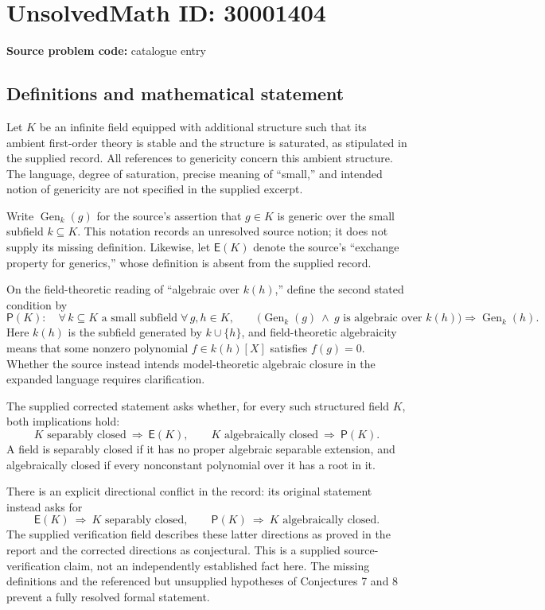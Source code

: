 \documentclass[11pt]{article}
\begin{document}
\section*{UnsolvedMath ID: 30001404}
\textbf{Source problem code:} catalogue entry
\subsection{Definitions and mathematical statement}
Let \(K\) be an infinite field equipped with additional structure such that its ambient first-order theory is stable and the structure is saturated, as stipulated in the supplied record. All references to genericity concern this ambient structure. The language, degree of saturation, precise meaning of ``small,'' and intended notion of genericity are not specified in the supplied excerpt.

Write \(\operatorname{Gen}_k(g)\) for the source's assertion that \(g\in K\) is generic over the small subfield \(k\subseteq K\). This notation records an unresolved source notion; it does not supply its missing definition. Likewise, let \(\mathsf{E}(K)\) denote the source's ``exchange property for generics,'' whose definition is absent from the supplied record.

On the field-theoretic reading of ``algebraic over \(k(h)\),'' define the second stated condition by
\[
\mathsf{P}(K):\quad
\forall\, k\subseteq K\text{ a small subfield}\;
\forall\,g,h\in K,\qquad
\bigl(\operatorname{Gen}_k(g)\ \land\ g\text{ is algebraic over }k(h)\bigr)
\Longrightarrow \operatorname{Gen}_k(h).
\]
Here \(k(h)\) is the subfield generated by \(k\cup\{h\}\), and field-theoretic algebraicity means that some nonzero polynomial \(f\in k(h)[X]\) satisfies \(f(g)=0\). Whether the source instead intends model-theoretic algebraic closure in the expanded language requires clarification.

The supplied corrected statement asks whether, for every such structured field \(K\), both implications hold:
\[
K\text{ separably closed}\ \Longrightarrow\ \mathsf{E}(K),
\qquad
K\text{ algebraically closed}\ \Longrightarrow\ \mathsf{P}(K).
\]
A field is separably closed if it has no proper algebraic separable extension, and algebraically closed if every nonconstant polynomial over it has a root in it.

There is an explicit directional conflict in the record: its original statement instead asks for
\[
\mathsf{E}(K)\ \Longrightarrow\ K\text{ separably closed},
\qquad
\mathsf{P}(K)\ \Longrightarrow\ K\text{ algebraically closed}.
\]
The supplied verification field describes these latter directions as proved in the report and the corrected directions as conjectural. This is a supplied source-verification claim, not an independently established fact here. The missing definitions and the referenced but unsupplied hypotheses of Conjectures 7 and 8 prevent a fully resolved formal statement.
\end{document}
